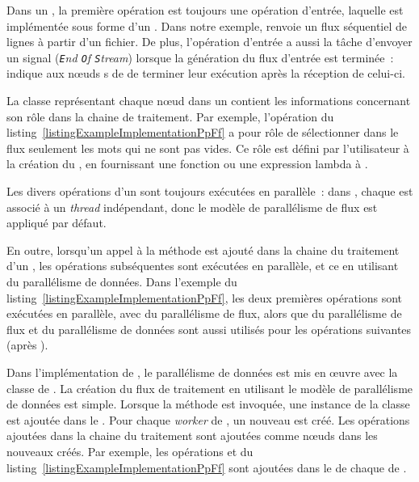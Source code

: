 Dans un , la premi\`ere op\'eration est toujours une op\'eration d'entr\'ee, laquelle est impl\'ement\'ee sous forme d'un . Dans notre exemple,  renvoie un flux s\'equentiel de lignes \`a partir d'un fichier. De plus, l'op\'eration d'entr\'ee a aussi la t\^ache d'envoyer un signal  (\emph{\texttt{E}nd \texttt{O}f \texttt{S}tream}) lorsque la g\'en\'eration du flux d'entr\'ee est termin\'ee~:  indique aux nœuds s de  de terminer leur ex\'ecution apr\`es la r\'eception de celui-ci.

La classe repr\'esentant chaque nœud dans un  contient les informations concernant son r\^ole dans la chaine de traitement. Par exemple, l'op\'eration  du listing~\ref{listingExampleImplementationPpFf} a pour r\^ole de s\'electionner dans le flux seulement les mots qui ne sont pas vides. Ce r\^ole est d\'efini par l'utilisateur \`a la cr\'eation du , en fournissant une fonction ou une expression lambda \`a .


Les divers op\'erations d'un  sont toujours ex\'ecut\'ees en parall\`ele~: dans , chaque  est associ\'e \`a un \emph{thread} ind\'ependant, donc le mod\`ele de parall\'elisme de flux est appliqu\'e par d\'efaut. 

En outre, lorsqu'un appel \`a la m\'ethode  est ajout\'e dans la chaine du traitement d'un , les op\'erations subs\'equentes sont ex\'ecut\'ees en parall\`ele, et ce en utilisant du parall\'elisme de donn\'ees. Dans l'exemple du listing~\ref{listingExampleImplementationPpFf}, les deux premi\`eres op\'erations sont ex\'ecut\'ees en parall\`ele, avec du parall\'elisme de flux, alors que du parall\'elisme de flux et du parall\'elisme de donn\'ees sont aussi utilis\'es pour les op\'erations suivantes (apr\`es ). 

Dans l'impl\'ementation de , le parall\'elisme de donn\'ees est mis en œuvre avec la classe  de . La cr\'eation du flux de traitement en utilisant le mod\`ele de parall\'elisme de donn\'ees est simple. Lorsque la m\'ethode  est invoqu\'ee, une instance de la classe  est ajout\'ee dans le . Pour chaque \emph{worker} de , un nouveau  est cr\'e\'e. Les op\'erations ajout\'ees dans la chaine du traitement  sont ajout\'ees comme nœuds dans les nouveaux  cr\'e\'es. Par exemple, les op\'erations  et  du listing~\ref{listingExampleImplementationPpFf} sont ajout\'ees dans le  de chaque  de . 


